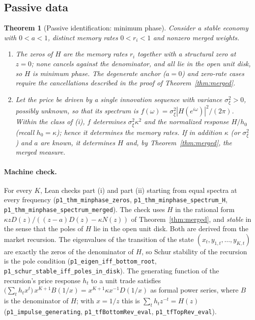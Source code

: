 \documentclass[12pt]{article}
\newtheorem{theorem}{Theorem}[section]
\theoremstyle{definition}
\theoremstyle{remark}
\begin{document}
\subsection{Passive data}

\begin{theorem}[Passive identification: minimum phase]\label{thm:minphase}
Consider a stable economy with $0<a<1$, distinct memory rates $0<r_i<1$ and nonzero merged weights.
\begin{enumerate}[label=(\roman*)]
\item The zeros of $H$ are the memory rates $r_i$ together with a structural zero at $z=0$; none cancels against the denominator, and all lie in the open unit disk, so $H$ is minimum phase. The degenerate anchor ($a=0$) and zero-rate cases require the cancellations described in the proof of Theorem~\ref{thm:merged}.
\item Let the price be driven by a single innovation sequence with variance $\sigma_\xi^2>0$, possibly unknown, so that its spectrum is $f(\omega)=\sigma_\xi^2|H(e^{i\omega})|^2/(2\pi)$. Within the class of (i), $f$ determines $\sigma_\xi^2\kappa^2$ and the normalized response $H/h_0$ (recall $h_0=\kappa$); hence it determines the memory rates. If in addition $\kappa$ (or $\sigma_\xi^2$) and $a$ are known, it determines $H$ and, by Theorem~\ref{thm:merged}, the merged measure.
\end{enumerate}
\end{theorem}

\paragraph{Machine check.} For every $K$, Lean checks part (i) and part (ii) starting from equal spectra at every frequency (\texttt{p1\_thm\_minphase\_zeros}, \texttt{p1\_thm\_minphase\_spectrum\_H}, \texttt{p1\_thm\_minphase\_spectrum\_merged}). The check uses $H$ in the rational form $\kappa zD(z)/((z-a)D(z)-\kappa N(z))$ of Theorem~\ref{thm:merged}, and \emph{stable} in the sense that the poles of $H$ lie in the open unit disk. Both are derived from the market recursion. The eigenvalues of the transition of the state $(x_t,y_{1,t},\ldots,y_{K,t})$ are exactly the zeros of the denominator of $H$, so Schur stability of the recursion is the pole condition (\texttt{p1\_eigen\_iff\_bottom\_root}, \texttt{p1\_schur\_stable\_iff\_poles\_in\_disk}). The generating function of the recursion's price response $h_t$ to a unit trade satisfies $\bigl(\sum_th_tx^t\bigr)\,x^{K+1}B(1/x)=x^{K+1}\kappa x^{-1}D(1/x)$ as formal power series, where $B$ is the denominator of $H$; with $x=1/z$ this is $\sum_th_tz^{-t}=H(z)$ (\texttt{p1\_impulse\_generating}, \texttt{p1\_tfBottomRev\_eval}, \texttt{p1\_tfTopRev\_eval}).
\end{document}
